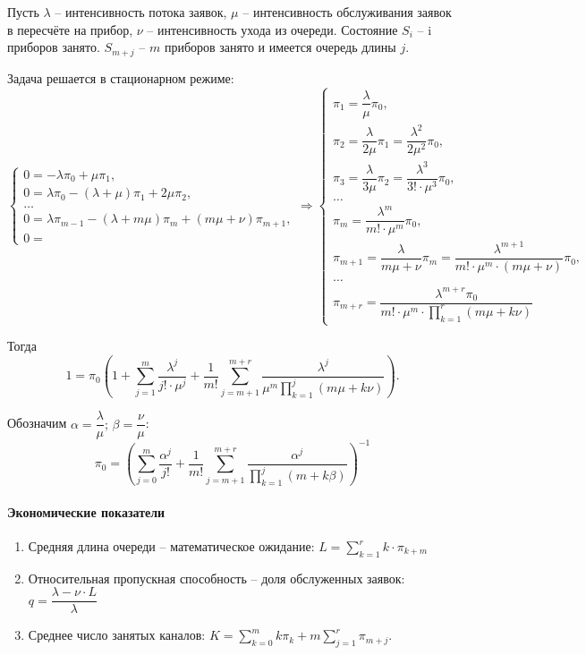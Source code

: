 Пусть $\lambda$ -- интенсивность потока заявок, $\mu$ -- интенсивность обслуживания
заявок в пересчёте на прибор, $\nu$ -- интенсивность ухода из очереди.
Состояние $S_i$ -- i приборов занято. $S_{m+j}$ -- $m$ приборов занято и имеется
очередь длины $j$.

Задача решается в стационарном режиме:
\[
  \begin{cases}
    0 = -\lambda \pi_0 + \mu \pi_1, \\
    0 = \lambda \pi_0 - (\lambda+\mu) \pi_1 + 2\mu\pi_2, \\
    \dots \\
    0 = \lambda \pi_{m-1} - (\lambda+m\mu) \pi_m + (m\mu+\nu) \pi_{m+1}, \\
    0 = 
  \end{cases}
  \Rightarrow
  \begin{cases}
    \pi_1 = \dfrac{\lambda}{\mu} \pi_0, \\
    \pi_2 = \dfrac{\lambda}{2\mu}\pi_1 = \dfrac{\lambda^2}{2\mu^2} \pi_0,\\
    \pi_3 = \dfrac{\lambda}{3\mu} \pi_2 = \dfrac{\lambda^3}{3! \cdot \mu^3} \pi_0, \\
    \dots \\
    \pi_m = \dfrac{\lambda^m}{m! \cdot \mu^m} \pi_0, \\
    \pi_{m+1} = \dfrac{\lambda}{m\mu + \nu} \pi_m = \dfrac{\lambda^{m+1}}{m! \cdot \mu^m \cdot (m\mu+\nu)} \pi_0, \\
    \dots\\
    \pi_{m+r} = \dfrac{\lambda^{m+r} \pi_0}{m! \cdot \mu^m \cdot \prod_{k=1}^r (m\mu+k\nu)}
  \end{cases}
\]

Тогда
\[
1 = \pi_0 \left( 1
  + \sum_{j=1}^m \dfrac{\lambda^j}{j! \cdot \mu^j}
+ \dfrac{1}{m!} \sum_{j=m+1}^{m+r} \dfrac{\lambda^j}{\mu^m \prod_{k=1}^j (m\mu + k\nu)} \right).
\]

Обозначим $\alpha = \dfrac{\lambda}{\mu}; \, \beta = \dfrac{\nu}{\mu}$:
\[
  \pi_0 = \left( \sum_{j=0}^m \dfrac{\alpha^j}{j!}
  + \dfrac{1}{m!} \sum_{j=m+1}^{m+r} \dfrac{\alpha^j}{\prod_{k=1}^j (m+k\beta)} \right)^{-1}
\]

\paragraph{Экономические показатели}
\begin{enumerate}
  \item Средняя длина очереди -- математическое ожидание:
    $L = \sum_{k=1}^r k \cdot \pi_{k+m}$

  \item Относительная пропускная способность -- доля обслуженных заявок:
    $q = \dfrac{\lambda - \nu\cdot L}{\lambda}$

  \item Среднее число занятых каналов:
    $K = \sum_{k=0}^m k \pi_k + m \sum_{j=1}^r \pi_{m+j}$.
\end{enumerate}

